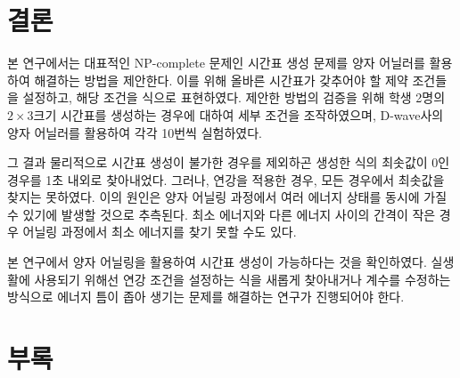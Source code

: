 \documentclass[12pt,a4paper]{article}
\begin{document}
    \section{결론}

    본 연구에서는 대표적인 NP-complete 문제인 시간표 생성 문제를 양자 어닐러를 활용하여 해결하는 방법을 제안한다. 이를 위해 올바른 시간표가 갖추어야 할 제약 조건들을 설정하고, 해당 조건을 식으로 표현하였다. 제안한 방법의 검증을 위해 학생 2명의 $2\times3$크기 시간표를 생성하는 경우에 대하여 세부 조건을 조작하였으며, D-wave사의 양자 어닐러를 활용하여 각각 10번씩 실험하였다.

    그 결과 물리적으로 시간표 생성이 불가한 경우를 제외하곤 생성한 식의 최솟값이 0인 경우를 1초 내외로 찾아내었다. 그러나, 연강을 적용한 경우, 모든 경우에서 최솟값을 찾지는 못하였다. 이의 원인은 양자 어닐링 과정에서 여러 에너지 상태를 동시에 가질 수 있기에 발생할 것으로 추측된다. 최소 에너지와 다른 에너지 사이의 간격이 작은 경우 어닐링 과정에서 최소 에너지를 찾기 못할 수도 있다.

    본 연구에서 양자 어닐링을 활용하여 시간표 생성이 가능하다는 것을 확인하였다. 실생활에 사용되기 위해선 연강 조건을 설정하는 식을 새롭게 찾아내거나 계수를 수정하는 방식으로 에너지 틈이 좁아 생기는 문제를 해결하는 연구가 진행되어야 한다.

    
    
    
    \newpage
    \section{부록}\label{results}
\end{document}
